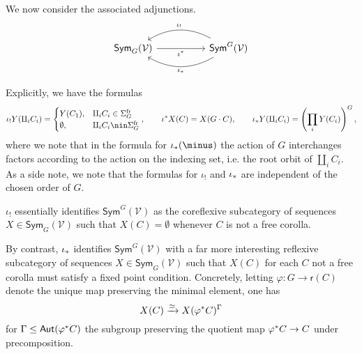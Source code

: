 \documentclass[a4paper,10pt]{article}%
\begin{document}
We now consider the associated adjunctions.
\begin{equation}\label{TWOADJOINTS EQ}
\begin{tikzcd}[column sep =5em]
	\mathsf{Sym}_G(\mathcal{V}) \ar{r}[swap]{\iota^{\**}} 
	&
	\mathsf{Sym}^G(\mathcal{V})
	\ar[bend right]{l}[swap,midway]{\iota_{!}}
	\ar[bend left]{l}{\iota_{\**}}
\end{tikzcd}
\end{equation}


Explicitly, we have the formulas
\[
	\iota_!Y(\amalg_i C_i)=
	\begin{cases}
	Y(C_1), & \amalg_i C_i \in \Sigma_G^{\text{fr}} \\
	\emptyset, & \amalg_i C_i \nin \Sigma_G^{\text{fr}}
	\end{cases},
\qquad
	\iota^{\**}X (C) = X(G \cdot C),
\qquad
	\iota_{\**}Y (\amalg_i C_i)=
	\left(\prod_i Y(C_i)\right)^G,
\]
where we note that in the formula for $\iota_{\**}(\minus)$
the action of $G$ interchanges factors according to the action on the indexing set, i.e. the root orbit of $\amalg_i C_i$.
As a side note, we note that the formulas for $\iota_!$ and $\iota_{\**}$ are independent of the chosen order of $G$.

\begin{remark}\label{REFLCOREFL REM}
	$\iota_!$ essentially identifies 
	$\mathsf{Sym}^G(\mathcal{V})$ as the coreflexive subcategory of sequences 
	$X \in \mathsf{Sym}_G(\mathcal{V})$ such that $X(C)=\emptyset$ whenever $C$ is not a free corolla.

By contrast, $\iota_{\**}$ identifies 
$\mathsf{Sym}^G(\mathcal{V})$ with a far more interesting reflexive subcategory of sequences 
$X \in \mathsf{Sym}_G(\mathcal{V})$ 
such that $X(C)$ for each $C$ not a free corolla must satisfy a fixed point condition. Concretely, letting 
$\varphi \colon G \to \mathsf{r}(C)$
denote the unique map preserving the minimal element, one has
\[X(C) \xrightarrow{\simeq} X(\varphi^{\**}C)^{\Gamma}\]
for 
$\Gamma \leq \mathsf{Aut}(\varphi^{\**}C)$
the subgroup preserving the quotient map
$\varphi^{\**}C \to C$
under precomposition.
\end{remark}
\end{document}
